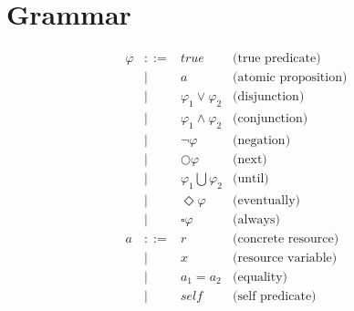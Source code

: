 \section{Grammar}
\[
\begin{array}{rcll}
    \varphi     & ::=   & true                          & \text{(true predicate)} \\
                & |     & a                             & \text{(atomic proposition)} \\
                & |     & \varphi_1 \vee \varphi_2      & \text{(disjunction)} \\
                & |     & \varphi_1 \wedge \varphi_2    & \text{(conjunction)} \\
                & |     & \neg \varphi                  & \text{(negation)} \\
                & |     & \bigcirc \varphi              & \text{(next)} \\
                & |     & \varphi_1 \bigcup \varphi_2   & \text{(until)} \\
                & |     & \Diamond \varphi              & \text{(eventually)} \\
                & |     & \square \varphi               & \text{(always)} \\
    a           &::=    & r                             & \text{(concrete resource)} \\
                & |     & x                             & \text{(resource variable)} \\
                & |     & a_1 = a_2                     & \text{(equality)} \\
                & |     & self                          & \text{(self predicate)} \\
\end{array}
\]